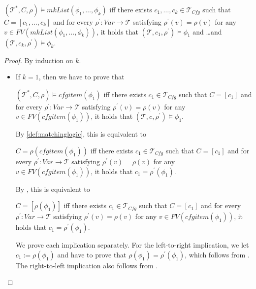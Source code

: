 \documentclass{article}
\newcommand{\Tcfg}{\mathcal{T}_{\mathit{Cfg}}}
\newenvironment{proofenv}
  {
    \VerbatimEnvironment\begin{tcolorbox}[colback=black!0!white] %
  }
  {
   \end{tcolorbox}
  }
\begin{document}
\begin{lemma}
$(\mathcal{T}^*, C, \rho) \vDash \mathit{mkList}(\phi_1,\ldots,\phi_k)$
iff there exists $c_1, \ldots, c_k \in \Tcfg$ such that $C = [c_1, \ldots, c_k]$ and for every $\rho^\prime : \mathit{Var} \to \mathcal{T}$ satisfying
$\rho^\prime(v) = \rho(v)$ for any \\
$v \in \mathit{FV}(\mathit{mkList}(\phi_1, \ldots, \phi_k))$,
it holds that 
$(\mathcal{T}, c_1, \rho^\prime) \vDash \phi_1$ and \ldots and $(\mathcal{T}, c_k, \rho^\prime) \vDash \phi_k$.
\end{lemma}
\begin{proof}
By induction on $k$.
\begin{itemize}
    \item If $k = 1$, then we have to prove that
    \begin{proofenv}
    $(\mathcal{T}^*, C, \rho) \vDash \mathit{cfgitem}(\phi_1)$
    iff there exists $c_1 \in \Tcfg$ such that $C = [c_1]$ and for every $\rho^\prime : \mathit{Var} \to \mathcal{T}$ satisfying
    $\rho^\prime(v) = \rho(v)$ for any $v \in \mathit{FV}(\mathit{cfgitem}(\phi_1))$, it holds that
    $(\mathcal{T}, c, \rho^\prime) \vDash \phi_1$.
    \end{proofenv}
    By \cref{def:matchinglogic}, this is equivalent to
    \begin{proofenv}
    $C = \rho(\mathit{cfgitem}(\phi_1))$
    iff there exists $c_1 \in \Tcfg$ such that $C = [c_1]$ and for every $\rho^\prime : \mathit{Var} \to \mathcal{T}$ satisfying
    $\rho^\prime(v) = \rho(v)$ for any $v \in \mathit{FV}(\mathit{cfgitem}(\phi_1))$, it holds that
    $c_1 = \rho^\prime(\phi_1)$.
    \end{proofenv}
    By , this is equivalent to
    \begin{proofenv}
    $C = [\rho(\phi_1)]$
    iff there exists $c_1 \in \Tcfg$ such that $C = [c_1]$ and for every $\rho^\prime : \mathit{Var} \to \mathcal{T}$ satisfying
    $\rho^\prime(v) = \rho(v)$ for any $v \in \mathit{FV}(\mathit{cfgitem}(\phi_1))$, it holds that
    $c_1 = \rho^\prime(\phi_1)$.
    \end{proofenv}
    We prove each implication separately.
    For the left-to-right implication, we let $c_1 := \rho(\phi_1)$
    and have to prove that $\rho(\phi_1) = \rho^\prime(\phi_1)$, which follows from .
    The right-to-left implication also follows from  .
    

\end{itemize}
\end{proof}
\end{document}
